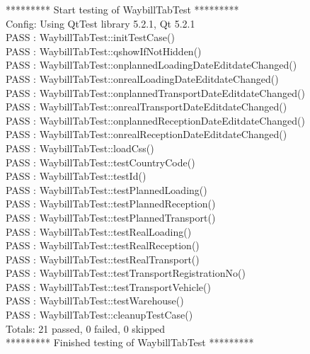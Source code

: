 \documentclass[11pt,fleqn]{report}
\begin{document}
********* Start testing of WaybillTabTest *********\\
Config: Using QtTest library 5.2.1, Qt 5.2.1\\
PASS   : WaybillTabTest::initTestCase()\\
PASS   : WaybillTabTest::qshowIfNotHidden()\\
PASS   : WaybillTabTest::onplannedLoadingDateEditdateChanged()\\
PASS   : WaybillTabTest::onrealLoadingDateEditdateChanged()\\
PASS   : WaybillTabTest::onplannedTransportDateEditdateChanged()\\
PASS   : WaybillTabTest::onrealTransportDateEditdateChanged()\\
PASS   : WaybillTabTest::onplannedReceptionDateEditdateChanged()\\
PASS   : WaybillTabTest::onrealReceptionDateEditdateChanged()\\
PASS   : WaybillTabTest::loadCss()\\
PASS   : WaybillTabTest::testCountryCode()\\
PASS   : WaybillTabTest::testId()\\
PASS   : WaybillTabTest::testPlannedLoading()\\
PASS   : WaybillTabTest::testPlannedReception()\\
PASS   : WaybillTabTest::testPlannedTransport()\\
PASS   : WaybillTabTest::testRealLoading()\\
PASS   : WaybillTabTest::testRealReception()\\
PASS   : WaybillTabTest::testRealTransport()\\
PASS   : WaybillTabTest::testTransportRegistrationNo()\\
PASS   : WaybillTabTest::testTransportVehicle()\\
PASS   : WaybillTabTest::testWarehouse()\\
PASS   : WaybillTabTest::cleanupTestCase()\\
Totals: 21 passed, 0 failed, 0 skipped\\
********* Finished testing of WaybillTabTest *********\\
\end{document}
